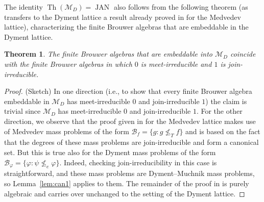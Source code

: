 \documentclass[11pt]{amsart}
\renewcommand{\phi}{\varphi}
\newtheorem{theorem}{Theorem}[section]
\newcommand{\Th}{\operatorname{Th}}
\newcommand{\JAN}{\operatorname{JAN}}
\newcommand{\Dym}{\mathscr{M}_{D}}
\begin{document}
The identity $\Th(\mathscr{M}_{D})=\JAN$ also follows from the following 
theorem (as transfers to the Dyment lattice a result already proved in 
\cite{Sorbi:Embedding} for the Medvedev lattice), characterizing the finite 
Brouwer algebras that are embeddable in the Dyment lattice. 
\begin{theorem}\label{thm:another} The finite Brouwer algebras that 
are embeddable into $\Dym$ coincide with the finite Brouwer algebras in which 
$0$ is meet-irreducible and $1$ is join-irreducible. 
\end{theorem} 
\begin{proof} (Sketch) In one direction (i.e., to show that every finite 
Brouwer algebra embeddable in $\Dym$ has meet-irreducible $0$ and 
join-irreducible $1$) the claim is trivial since $\Dym$ has meet-irreducible 
$0$ and join-irreducible $1$. For the other direction, we observe that the 
proof given in \cite{Sorbi:Embedding} for the Medvedev lattice makes use of 
Medvedev mass problems of the form $\mathcal{B}_f=\{g: g\nleq_T f\}$ and is 
based on the fact that the degrees of these mass problems are 
join-irreducible and form a canonical set. But this is true also for the 
Dyment mass problems of the form $\mathcal{B}_\phi=\{\phi: \psi \nleq_e 
\phi\}$. Indeed, checking join-irreducibility in this case is 
straightforward, and these mass problems are Dyment–Muchnik mass problems, so 
Lemma~\ref{lem:can1} applies to them. The remainder of the proof in 
\cite{Sorbi:Embedding} is purely algebraic and carries over unchanged to the 
setting of the Dyment lattice. 
\end{proof}

%
%
\end{document}
